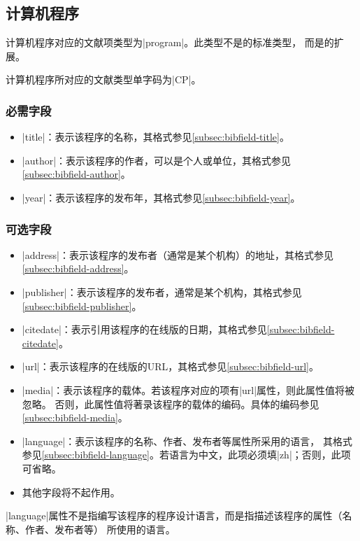 

\subsection{计算机程序}\label{subsec:bibtype-program}

计算机程序对应的{\BibTeX}文献项类型为|program|。此类型不是{\BibTeX}的标准类型，
而是{\njuthesis}的扩展。

计算机程序所对应的文献类型\cite{gbt3469-1983}单字码为|CP|。

\subsubsection{必需字段}

\begin{itemize}
\item |title|：表示该程序的名称，其格式参见\ref{subsec:bibfield-title}。
\item |author|：表示该程序的作者，可以是个人或单位，其格式参见
  \ref{subsec:bibfield-author}。
\item |year|：表示该程序的发布年，其格式参见\ref{subsec:bibfield-year}。
\end{itemize}

\subsubsection{可选字段}

\begin{itemize}
\item |address|：表示该程序的发布者（通常是某个机构）的地址，其格式参见
  \ref{subsec:bibfield-address}。
\item |publisher|：表示该程序的发布者，通常是某个机构，其格式参见
  \ref{subsec:bibfield-publisher}。
\item |citedate|：表示引用该程序的在线版的日期，其格式参见\ref{subsec:bibfield-citedate}。
\item |url|：表示该程序的在线版的URL，其格式参见\ref{subsec:bibfield-url}。
\item |media|：表示该程序的载体。若该程序对应的{\BibTeX}项有|url|属性，则此属性值将被忽略。
否则，此属性值将著录该程序的载体的编码。具体的编码参见\ref{subsec:bibfield-media}。
\item |language|：表示该程序的名称、作者、发布者等属性所采用的语言，
其格式参见\ref{subsec:bibfield-language}。若语言为中文，此项必须填|zh|；否则，此项可省略。
\item 其他字段将不起作用。
\end{itemize}

\begin{note}
|language|属性不是指编写该程序的程序设计语言，而是指描述该程序的属性（名称、作者、发布者等）
所使用的语言。
\end{note}

